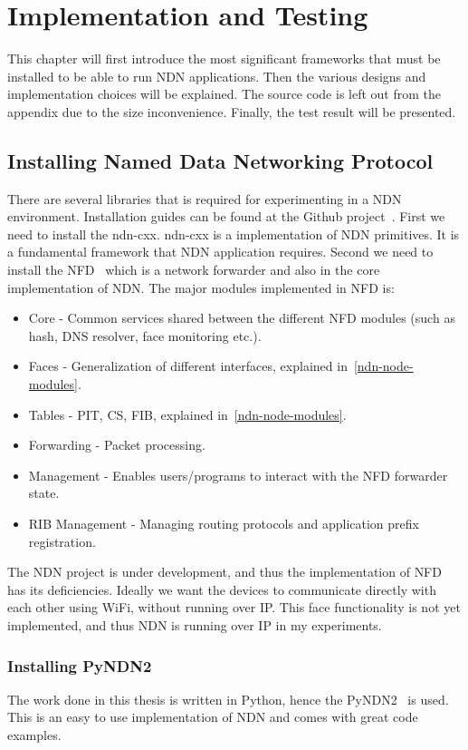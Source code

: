 \chapter{Implementation and Testing}
This chapter will first introduce the most significant frameworks that must be installed to be able to run \gls{NDN} applications.
Then the various designs and implementation choices will be explained.
The source code is left out from the appendix due to the size inconvenience. 
Finally, the test result will be presented.

\section{Installing Named Data Networking Protocol}

There are several libraries that is required for experimenting in a \gls{NDN} environment.
Installation guides can be found at the Github project~\cite{ndn-git}.
First we need to install the \gls{ndn-cxx}.
\gls{ndn-cxx} is a implementation of \gls{NDN} primitives. 
It is a fundamental framework that \gls{NDN} application requires. 
Second we need to install the \gls{NFD}~\cite{nfd} which is a network forwarder and also in the core implementation of \gls{NDN}.
The major modules implemented in \gls{NFD} is:
\begin{itemize}
  \item Core - Common services shared between the different \gls{NFD} modules (such as hash, \gls{DNS} resolver, face monitoring etc.).
  \item Faces - Generalization of different interfaces, explained in~\autoref{ndn-node-modules}.
  \item Tables - \gls{PIT}, \gls{CS}, \gls{FIB}, explained in~\autoref{ndn-node-modules}.
  \item Forwarding - Packet processing.
  \item Management - Enables users/programs to interact with the \gls{NFD} forwarder state.
  \item\gls{RIB} Management - Managing routing protocols and application prefix registration.
\end{itemize}
The \gls{NDN} project is under development, and thus the implementation of \gls{NFD} has its deficiencies.
Ideally we want the devices to communicate directly with each other using WiFi, without running over \gls{IP}. 
This face functionality is not yet implemented, and thus \gls{NDN} is running over \gls{IP} in my experiments.

\subsection{Installing PyNDN2}
The work done in this thesis is written in Python, hence the \gls{PyNDN2}~\cite{pyndn2-git} is used.
This is an easy to use implementation of \gls{NDN} and comes with great code examples.

